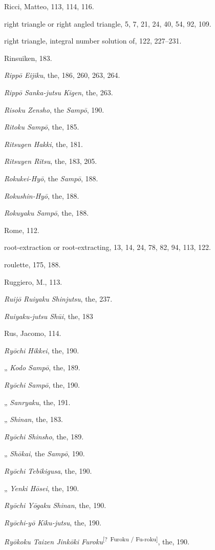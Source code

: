 \documentclass[11pt]{article}
\newcommand{\unclear}[1]{\textsuperscript{[?~#1]}}
\begin{document}
Ricci, Matteo, 113, 114, 116.\par
right triangle or right angled triangle, 5, 7, 21, 24, 40, 54, 92, 109.\par
right triangle, integral number solution of, 122, 227--231.\par
Rinsuiken, 183.\par
\emph{Rippō Eijiku}, the, 186, 260, 263, 264.\par
\emph{Rippō Sanka-jutsu Kigen}, the, 263.\par
\emph{Risoku Zensho}, the \emph{Sampō}, 190.\par
\emph{Ritoku Sampō}, the, 185.\par
\emph{Ritsugen Hakki}, the, 181.\par
\emph{Ritsuyen Ritsu}, the, 183, 205.\par
\emph{Rokukei-Hyō}, the \emph{Sampō}, 188.\par
\emph{Rokushin-Hyō}, the, 188.\par
\emph{Rokuyaku Sampō}, the, 188.\par
Rome, 112.\par
root-extraction or root-extracting, 13, 14, 24, 78, 82, 94, 113, 122.\par
roulette, 175, 188.\par
Ruggiero, M., 113.\par
\emph{Ruijō Ruiyaku Shinjutsu}, the, 237.\par
\emph{Ruiyaku-jutsu Shūi}, the, 183\par
Rus, Jacomo, 114.\par
\emph{Ryōchi Hikkei}, the, 190.\par
\quad „ \emph{Kodo Sampō}, the, 189.\par
\emph{Ryōchi Sampō}, the, 190.\par
\quad „ \emph{Sanryaku}, the, 191.\par
\quad „ \emph{Shinan}, the, 183.\par
\emph{Ryōchi Shinsho}, the, 189.\par
\quad „ \emph{Shōkai}, the \emph{Sampō}, 190.\par
\emph{Ryōchi Tebikigusa}, the, 190.\par
\quad „ \emph{Yenki Hōsei}, the, 190.\par
\emph{Ryōchi Yōgaku Shinan}, the, 190.\par
\emph{Ryōchi-yō Kiku-jutsu}, the, 190.\par
\emph{Ryōkoku Taizen Jinkōki Furoku}\unclear{Furoku / Fu-roku}, the, 190.\par
\end{document}
